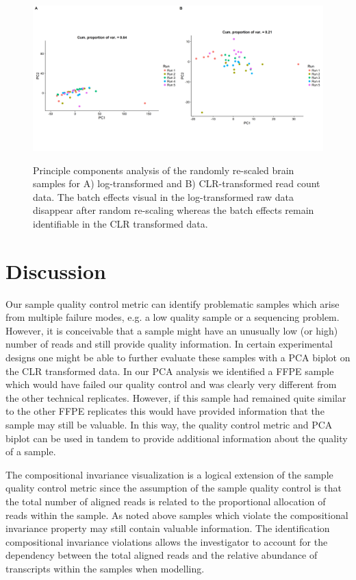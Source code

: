 \documentclass [10pt]{article}
\theoremstyle{definition}
\begin{document}
\begin{figure}
\includegraphics[scale=0.4]{./Figures/IO_PCA_Brain_logRaw_CLR_perturbed}
\label{rescaledPCAbrain}
\caption{Principle components analysis of the randomly re-scaled brain samples for A) log-transformed and B) CLR-transformed read count data.  The batch effects visual in the log-transformed raw data disappear after random re-scaling whereas the batch effects remain identifiable in the CLR transformed data.}
\end{figure}

\FloatBarrier
\section{Discussion}

Our sample quality control metric can identify problematic samples which arise from multiple failure modes, e.g. a low quality sample or a sequencing problem.  However, it is conceivable that a sample might have an unusually low (or high) number of reads and still provide quality information.  In certain experimental designs one might be able to further evaluate these samples with a PCA biplot on the CLR transformed data. In our PCA analysis we identified a FFPE sample which would have failed our quality control and was clearly very different from the other technical replicates.  However, if this sample had remained quite similar to the other FFPE replicates this would have provided information that the sample may still be valuable.  In this way, the quality control metric and PCA biplot can be used in tandem to provide additional information about the quality of a sample.

The compositional invariance visualization is a logical extension of the sample quality control metric since the assumption of the sample quality control is that the total number of aligned reads is related to the proportional allocation of reads within the sample.  As noted above samples which violate the compositional invariance property may still contain valuable information.  The identification compositional invariance violations allows the investigator to account for the dependency between the total aligned reads and the relative abundance of transcripts within the samples when modelling.
\end{document}
